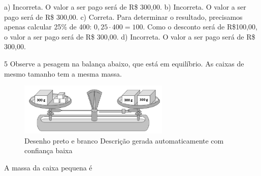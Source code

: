 \begin{escolha}
\begin{boxmedio}
\begin{boxmedio}
{\begin{boxpeq}
\begin{boxpeq}
{\begin{boxpeq}
\begin{boxmedio}
\begin{boxmedio}
\begin{boxpeq}
\begin{boxmedio}
\begin{boxpeq}
\begin{boxpeq}
\begin{boxpeq}
\begin{boxpeq}
\begin{boxmedio}
{\begin{boxmedio}
\begin{boxmedio}
\begin{boxpeq}
\begin{boxmedio}
\begin{boxpeq}
\begin{boxpeq}
\begin{boxpeq}
\begin{escolha}
{\begin{boxmedio}
\begin{boxpeq}
\begin{boxpeq}
\begin{boxpeq}
\begin{boxpeq}
\begin{boxpeq}
\begin{boxmedio}
\begin{boxpeq}
\begin{boxpeq}
\begin{boxpeq}
{\begin{boxpeq}
\begin{boxmedio}
\begin{boxpeq}
\begin{boxpeq}
\begin{boxpeq}
{\begin{boxpeq}
\begin{boxmedio}
{\begin{boxpeq}
\begin{boxpeq}
\begin{boxmedio}
\begin{boxmedio}
\begin{boxpeq}
\begin{boxpeq}
{\begin{boxpeq}
\begin{boxpeq}
\begin{boxpeq}
\begin{boxpeq}
\begin{boxpeq}
\begin{escolha}
\begin{escolha}
{\begin{boxmedio}
\begin{boxpeq}
\begin{q°}
\begin{boxmedio}
\begin{boxpeq}
\begin{boxpeq}
\begin{boxmedio}
\begin{boxmedio}
\begin{boxmedio}
\begin{boxmedio}
{\begin{escolha}
\begin{escolha}
\begin{escolha}
\begin{escolha}
\begin{escolha}
\begin{escolha}
{a) Incorreta. O valor a ser pago será de R\$ 300,00.
b) Incorreta. O valor a ser pago será de R\$ 300,00.
c) Correta. Para determinar o resultado, precisamos apenas calcular 
25\% de 400: $0,25 \cdot 400 = 100$. Como o desconto será de R\$100,00, 
o valor a ser pago será de R\$ 300,00.
d) Incorreta. O valor a ser pago será de R\$ 300,00.}

\num{5} Observe a pesagem na balança abaixo, que está em equilíbrio. As
caixas de mesmo tamanho tem a mesma massa.

\begin{figure}
\centering
\includegraphics[width=2.82812in,height=0.97757in]{./_SAEB_9_MAT/media/image263.png}
\caption{Desenho preto e branco Descrição gerada automaticamente com
confiança baixa}
\end{figure}


A massa da caixa pequena é


\end{escolha}
\end{escolha}
\end{escolha}
\end{escolha}
\end{escolha}
\end{escolha}}
\end{boxmedio}
\end{boxmedio}
\end{boxmedio}
\end{boxmedio}
\end{boxpeq}
\end{boxpeq}
\end{boxmedio}
\end{q°}
\end{boxpeq}
\end{boxmedio}}
\end{escolha}
\end{escolha}
\end{boxpeq}
\end{boxpeq}
\end{boxpeq}
\end{boxpeq}
\end{boxpeq}}
\end{boxpeq}
\end{boxpeq}
\end{boxmedio}
\end{boxmedio}
\end{boxpeq}
\end{boxpeq}}
\end{boxmedio}
\end{boxpeq}}
\end{boxpeq}
\end{boxpeq}
\end{boxpeq}
\end{boxmedio}
\end{boxpeq}}
\end{boxpeq}
\end{boxpeq}
\end{boxpeq}
\end{boxmedio}
\end{boxpeq}
\end{boxpeq}
\end{boxpeq}
\end{boxpeq}
\end{boxpeq}
\end{boxmedio}}
\end{escolha}
\end{boxpeq}
\end{boxpeq}
\end{boxpeq}
\end{boxmedio}
\end{boxpeq}
\end{boxmedio}
\end{boxmedio}}
\end{boxmedio}
\end{boxpeq}
\end{boxpeq}
\end{boxpeq}
\end{boxpeq}
\end{boxmedio}
\end{boxpeq}
\end{boxmedio}
\end{boxmedio}
\end{boxpeq}}
\end{boxpeq}
\end{boxpeq}}
\end{boxmedio}
\end{boxmedio}
\end{escolha}
